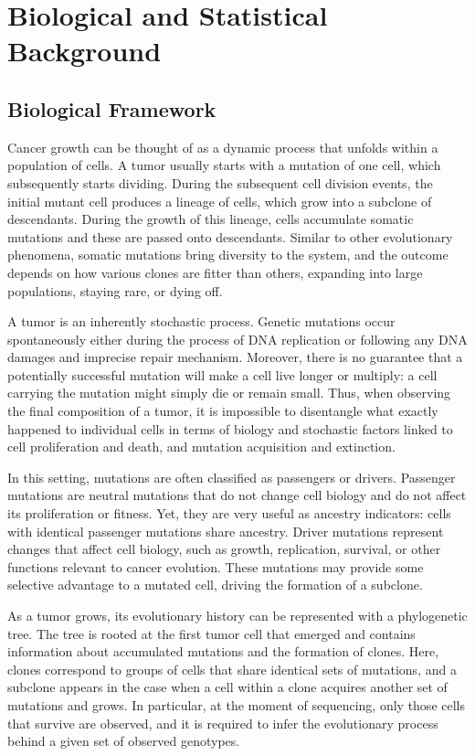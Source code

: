 \chapter{Biological and Statistical Background}

\section{Biological Framework}

Cancer growth can be thought of as a dynamic process that unfolds within a population of cells. A tumor usually starts with a mutation of one cell, which subsequently starts dividing. During the subsequent cell division events, the initial mutant cell produces a lineage of cells, which grow into a subclone of descendants. During the growth of this lineage, cells accumulate somatic mutations and these are passed onto descendants. Similar to other evolutionary phenomena, somatic mutations bring diversity to the system, and the outcome depends on how various clones are fitter than others, expanding into large populations, staying rare, or dying off.

A tumor is an inherently stochastic process. Genetic mutations occur spontaneously either during the process of DNA replication or following any DNA damages and imprecise repair mechanism. Moreover, there is no guarantee that a potentially successful mutation will make a cell live longer or multiply: a cell carrying the mutation might simply die or remain small. Thus, when observing the final composition of a tumor, it is impossible to disentangle what exactly happened to individual cells in terms of biology and stochastic factors linked to cell proliferation and death, and mutation acquisition and extinction.

In this setting, mutations are often classified as passengers or drivers. Passenger mutations are neutral mutations that do not change cell biology and do not affect its proliferation or fitness. Yet, they are very useful as ancestry indicators: cells with identical passenger mutations share ancestry. Driver mutations represent changes that affect cell biology, such as growth, replication, survival, or other functions relevant to cancer evolution. These mutations may provide some selective advantage to a mutated cell, driving the formation of a subclone.

As a tumor grows, its evolutionary history can be represented with a phylogenetic tree. The tree is rooted at the first tumor cell that emerged and contains information about accumulated mutations and the formation of clones. Here, clones correspond to groups of cells that share identical sets of mutations, and a subclone appears in the case when a cell within a clone acquires another set of mutations and grows. In particular, at the moment of sequencing, only those cells that survive are observed, and it is required to infer the evolutionary process behind a given set of observed genotypes.

